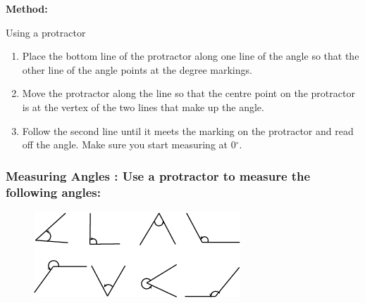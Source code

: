           \label{m39370*id314404}
            \textbf{Method:}
          \par 
          \label{m39370*id314412}Using a protractor\par 
          \label{m39370*id314417}\begin{enumerate}[noitemsep, label=\textbf{\arabic*}. ] 
            \label{m39370*uid14}\item Place the bottom line of the protractor along one line of the angle so that the other line of the angle points at the degree markings.
\label{m39370*uid15}\item Move the protractor along the line so that the centre point on the protractor is at the vertex of the two lines that make up the angle.
\label{m39370*uid16}\item Follow the second line until it meets the marking on the protractor and read off the angle. Make sure you start measuring at 0\begin{math}{}^{\circ }\end{math}.
\end{enumerate}
        
\label{m39370*secfhsst!!!underscore!!!id175}
            \subsubsection{  Measuring Angles : Use a protractor to measure the following angles:}
            \nopagebreak
            
          \label{m39370*id314481}
            
    \setcounter{subfigure}{0}


	\begin{figure}[H] %
    \begin{center}
    \label{m39370*id314484!!!underscore!!!media}\label{m39370*id314484!!!underscore!!!printimage}\includegraphics{col11306.imgs/m39370_MG10C13_005.png} %
        
      \vspace{2pt}
    \vspace{.1in}
    
    \end{center}

 \end{figure}   


